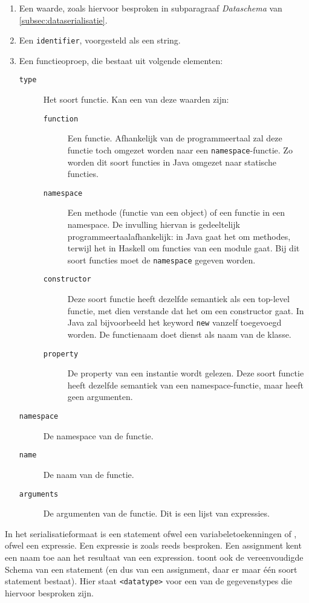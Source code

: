 \begin{enumerate}
    \item Een waarde, zoals hiervoor besproken in subparagraaf \emph{Dataschema} van \cref{subsec:dataserialisatie}.
    \item Een \texttt{identifier}, voorgesteld als een string.
    \item Een functieoproep, die bestaat uit volgende elementen:
    \begin{description}
        \item[\texttt{type}] Het soort functie.
        Kan een van deze waarden zijn:
        \begin{description}
            \item[\texttt{function}] Een  functie.
            Afhankelijk van de programmeertaal zal deze functie toch omgezet worden naar een \texttt{namespace}-functie.
            Zo worden dit soort functies in Java omgezet naar statische functies.
            \item[\texttt{namespace}] Een methode (functie van een object) of een functie in een namespace.
            De invulling hiervan is gedeeltelijk programmeertaalafhankelijk: in Java gaat het om methodes, terwijl het in Haskell om functies van een module gaat.
            Bij dit soort functies moet de \texttt{namespace} gegeven worden.
            \item[\texttt{constructor}] Deze soort functie heeft dezelfde semantiek als een top-level functie, met dien verstande dat het om een constructor gaat.
            In Java zal bijvoorbeeld het keyword \texttt{new} vanzelf toegevoegd worden.
            De functienaam doet dienst als naam van de klasse.
            \item[\texttt{property}] De property van een instantie wordt gelezen.
            Deze soort functie heeft dezelfde semantiek van een namespace-functie, maar heeft geen argumenten.
        \end{description}
        \item[\texttt{namespace}] De namespace van de functie.
        \item[\texttt{name}] De naam van de functie.
        \item[\texttt{arguments}] De argumenten van de functie.
        Dit is een lijst van expressies.
    \end{description}
\end{enumerate}

In het serialisatieformaat is een statement ofwel een variabeletoekenningen of , ofwel een expressie.
Een expressie is zoals reeds besproken.
Een assignment kent een naam toe aan het resultaat van een expression.
 toont ook de vereenvoudigde  Schema van een statement (en dus van een assignment, daar er maar één soort statement bestaat).
Hier staat \texttt{<datatype>} voor een van de gegevenstypes die hiervoor besproken zijn.

